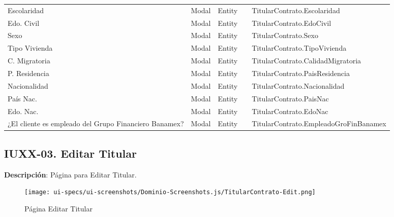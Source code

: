 \begin{table}[H]
{\begin{tabular}{ p{4cm} p{2cm} p{2cm} p{3cm} p{8cm} }
		Escolaridad &
		Modal &
		Entity &
		 &
		TitularContrato.Escolaridad \\
		Edo. Civil &
		Modal &
		Entity &
		 &
		TitularContrato.EdoCivil \\
		Sexo &
		Modal &
		Entity &
		 &
		TitularContrato.Sexo \\
		Tipo Vivienda &
		Modal &
		Entity &
		 &
		TitularContrato.TipoVivienda \\
		C. Migratoria &
		Modal &
		Entity &
		 &
		TitularContrato.CalidadMigratoria \\
		P. Residencia &
		Modal &
		Entity &
		 &
		TitularContrato.PaisResidencia \\
		Nacionalidad &
		Modal &
		Entity &
		 &
		TitularContrato.Nacionalidad \\
		Pa\'is Nac. &
		Modal &
		Entity &
		 &
		TitularContrato.PaisNac \\
		Edo. Nac. &
		Modal &
		Entity &
		 &
		TitularContrato.EdoNac \\
		¿El cliente es empleado del Grupo Financiero Banamex? &
		Modal &
		Entity &
		 &
		TitularContrato.EmpleadoGroFinBanamex \\
		\hline
	\end{tabular}
	}
\end{table}

\clearpage
\subsection{IUXX-03. Editar Titular} \label{sec:ui-page-update-titularcontrato}

\textbf{Descripci\'on}: P\'agina para Editar Titular.\\

\begin{figure}[H]
	\label{tab:ui-edit-titularcontrato-page}
	\texttt{[image: ui-specs/ui-screenshots/Dominio-Screenshots.js/TitularContrato-Edit.png]}
	\caption{P\'agina Editar Titular}
\end{figure}

